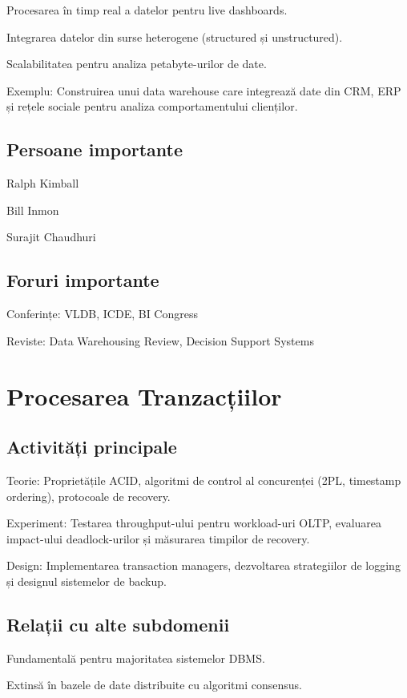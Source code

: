 \documentclass[12pt]{article}
\begin{document}
Procesarea în timp real a datelor pentru live dashboards.

Integrarea datelor din surse heterogene (structured și unstructured).

Scalabilitatea pentru analiza petabyte-urilor de date.

Exemplu: Construirea unui data warehouse care integrează date din CRM, ERP și rețele sociale pentru analiza comportamentului clienților.

\subsection*{Persoane importante}

Ralph Kimball

Bill Inmon

Surajit Chaudhuri

\subsection*{Foruri importante}

Conferințe: VLDB, ICDE, BI Congress

Reviste: Data Warehousing Review, Decision Support Systems

\section{Procesarea Tranzacțiilor}

\subsection*{Activități principale}

Teorie: Proprietățile ACID, algoritmi de control al concurenței (2PL, timestamp ordering), protocoale de recovery.

Experiment: Testarea throughput-ului pentru workload-uri OLTP, evaluarea impact-ului deadlock-urilor și măsurarea timpilor de recovery.

Design: Implementarea transaction managers, dezvoltarea strategiilor de logging și designul sistemelor de backup.

\subsection*{Relații cu alte subdomenii}

Fundamentală pentru majoritatea sistemelor DBMS.

Extinsă în bazele de date distribuite cu algoritmi consensus.
\end{document}
